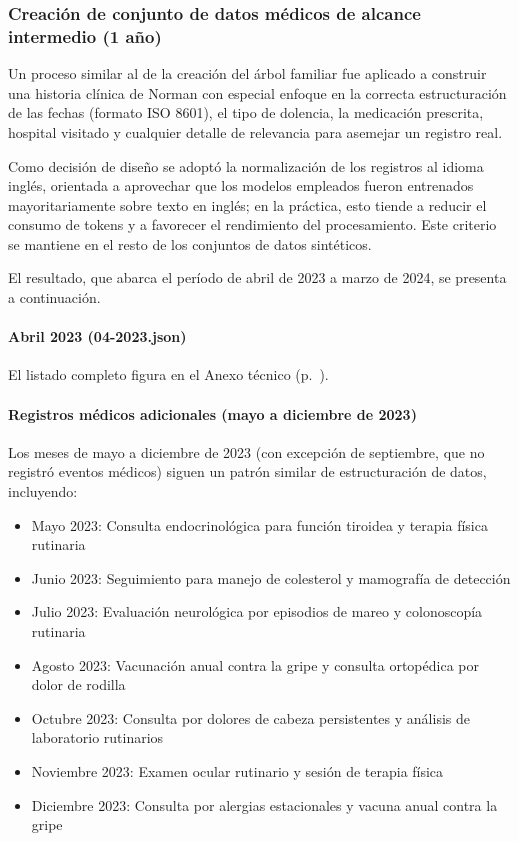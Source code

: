 \subsubsection{Creación de conjunto de datos médicos de alcance intermedio (1 año)}

Un proceso similar al de la creación del árbol familiar fue aplicado a construir una historia clínica de Norman con especial enfoque en la correcta estructuración de las fechas (formato ISO 8601), el tipo de dolencia, la medicación prescrita, hospital visitado y cualquier detalle de relevancia para asemejar un registro real.

Como decisión de diseño se adoptó la normalización de los registros al idioma inglés, orientada a aprovechar que los modelos empleados fueron entrenados mayoritariamente sobre texto en inglés; en la práctica, esto tiende a reducir el consumo de tokens y a favorecer el rendimiento del procesamiento. Este criterio se mantiene en el resto de los conjuntos de datos sintéticos.

El resultado, que abarca el período de abril de 2023 a marzo de 2024, se presenta a continuación.

\paragraph{Abril 2023 (04-2023.json)}

El listado completo figura en el Anexo técnico (p.~\pageref{anexo:code-4-3-2-4}).

\paragraph{Registros médicos adicionales (mayo a diciembre de 2023)}

Los meses de mayo a diciembre de 2023 (con excepción de septiembre, que no registró eventos médicos) siguen un patrón similar de estructuración de datos, incluyendo:

\begin{itemize}
\item Mayo 2023: Consulta endocrinológica para función tiroidea y terapia física rutinaria
\item Junio 2023: Seguimiento para manejo de colesterol y mamografía de detección
\item Julio 2023: Evaluación neurológica por episodios de mareo y colonoscopía rutinaria
\item Agosto 2023: Vacunación anual contra la gripe y consulta ortopédica por dolor de rodilla
\item Octubre 2023: Consulta por dolores de cabeza persistentes y análisis de laboratorio rutinarios
\item Noviembre 2023: Examen ocular rutinario y sesión de terapia física
\item Diciembre 2023: Consulta por alergias estacionales y vacuna anual contra la gripe
\end{itemize}

